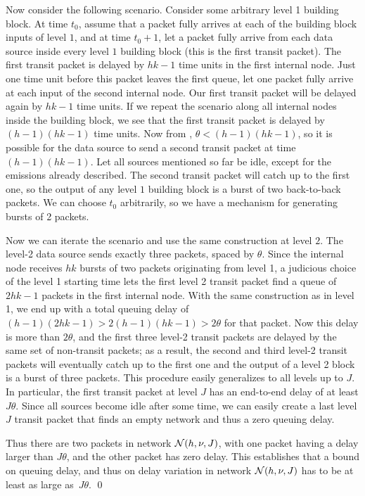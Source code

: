 Now consider the following scenario. Consider some arbitrary level
1 building block. At time $t_0$, assume that a packet fully
arrives at each of the building block inputs of level $1$, and at
time $t_0+1$, let a packet fully arrive from each data source
inside every level $1$ building block (this is the first transit
packet). The first transit packet is delayed by $hk-1$ time units
in the first internal node. Just one time unit before this packet
leaves the first queue, let one packet fully arrive at each input
of the second internal node. Our first transit packet will be
delayed again by $hk-1$ time units. If we repeat the scenario
along all internal nodes inside the building block, we see that
the first transit packet is delayed by $(h-1)(hk-1)$ time units.
Now from , $\theta < (h-1)(hk-1)$, so it is possible for
the data source to send a second transit packet at time
$(h-1)(hk-1)$. Let all sources mentioned so far be idle, except
for the emissions already described. The second transit packet
will catch up to the first one, so the output of any level $1$
building block is a burst of two back-to-back packets. We can
choose $t_0$ arbitrarily, so we have a mechanism for generating
bursts of 2 packets.

Now we can iterate the scenario and use the same construction at
level $2$. The level-2 data source sends exactly three packets,
spaced by $\theta$. Since the internal node receives $hk$ bursts
of two packets originating from level 1, a judicious choice of the
level 1 starting time lets the first level 2 transit packet find a
queue of $2hk -1$ packets in the first internal node. With the
same construction as in level 1, we end up with a total queuing
delay of $(h-1)(2hk -1) > 2(h-1)(hk-1)> 2\theta$ for that packet.
Now this delay is more than $2 \theta$, and the first three
level-2 transit packets are delayed by the same set of non-transit
packets; as a result, the second and third level-2 transit packets
will eventually catch up to the first one and the output of a
level 2 block is a burst of three packets. This procedure easily
generalizes to all levels up to $J$. In particular, the first
transit packet at level $J$ has an end-to-end delay of at least
$J\theta$. Since all sources become idle after some time, we can
easily create a last level $J$ transit packet that finds an empty
network and thus a zero queuing delay.

Thus there are two packets in network $\mathcal N(h, \nu, J)$, with one
packet having a delay larger than $J \theta$, and the other packet
has zero delay. This establishes that a bound on queuing delay,
and thus on delay variation in network $\mathcal N(h, \nu, J)$ has to
be at least as large as~$J \theta$. \qed

